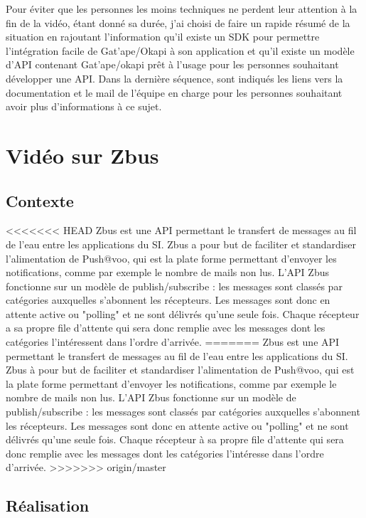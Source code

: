 Pour éviter que les personnes les moins techniques ne perdent leur attention à la fin de la vidéo, étant donné sa durée, j'ai choisi de faire un rapide résumé de la situation en rajoutant l'information qu'il existe un SDK pour permettre l'intégration facile de Gat'ape/Okapi à son application et qu'il existe un modèle d'API contenant Gat'ape/okapi prêt à l'usage pour les personnes souhaitant développer une API. Dans la dernière séquence, sont indiqués les liens vers la documentation et le mail de l'équipe en charge pour les personnes souhaitant avoir plus d'informations à ce sujet. 



\section{Vidéo sur Zbus}

\subsection{Contexte}
<<<<<<< HEAD
Zbus est une API permettant le transfert de messages au fil de l'eau entre les applications du SI. Zbus a pour but de faciliter et standardiser l'alimentation de Push@voo, qui est la plate forme permettant d'envoyer les notifications,  comme par exemple le nombre de mails non lus. L'API Zbus fonctionne sur un modèle de publish/subscribe : les messages sont classés par catégories auxquelles s'abonnent les récepteurs. Les messages sont donc en attente active ou "polling" et ne sont délivrés qu'une seule fois. Chaque récepteur a sa propre file d'attente qui sera donc remplie avec les messages dont les catégories l'intéressent dans l'ordre d'arrivée.  
=======
Zbus est une API permettant le transfert de messages au fil de l'eau entre les applications du SI. Zbus à pour but de faciliter et standardiser l'alimentation de Push@voo, qui est la plate forme permettant d'envoyer les notifications,  comme par exemple le nombre de mails non lus. L'API Zbus fonctionne sur un modèle de publish/subscribe : les messages sont classés par catégories auxquelles s'abonnent les récepteurs. Les messages sont donc en attente active ou "polling" et ne sont délivrés qu'une seule fois. Chaque récepteur à sa propre file d'attente qui sera donc remplie avec les messages dont les catégories l'intéresse dans l'ordre d'arrivée.  
>>>>>>> origin/master


\subsection{Réalisation}

